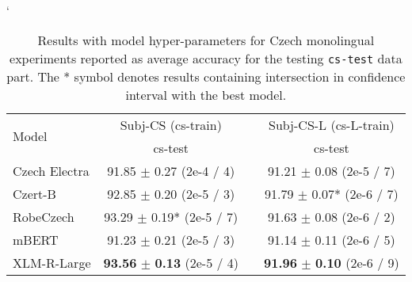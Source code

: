 \documentclass[10pt, a4paper]{article}
\begin{document}
\begin{table}[H]
\catcode`
\begin{adjustbox}{width=1\linewidth,center}
\begin{tabular}{lccc} \toprule
 \multirow{2}{*}{Model}                       & \multicolumn{1}{c}{Subj-CS (cs-train)}  &   & \multicolumn{1}{c}{Subj-CS-L (cs-L-train)}                                  \\ \cline{2-2} \cline{4-4} 
        & \multicolumn{1}{c}{cs-test}  &       & \multicolumn{1}{c}{cs-test}     \\ \midrule
Czech Electra & 91.85 $\pm$ 0.27\phantom{*} \footnotesize{(2e-4 / 4)}  & & 91.21 $\pm$ 0.08\phantom{*} \footnotesize{(2e-5 / 7)} \\
Czert-B    & 92.85 $\pm$ 0.20\phantom{*} \footnotesize{(2e-5 / 3)}  & & 91.79 $\pm$ 0.07* \footnotesize{(2e-6 / 7)} \\
RobeCzech    & 93.29 $\pm$ 0.19* \footnotesize{(2e-5 / 7)}   & & 91.63 $\pm$ 0.08\phantom{*} \footnotesize{(2e-6 / 2)} \\
mBERT        & 91.23 $\pm$ 0.21\phantom{*} \footnotesize{(2e-5 / 3)}  & & 91.14 $\pm$ 0.11\phantom{*} \footnotesize{(2e-6 / 5)} \\
XLM-R-Large  & \textbf{93.56} $\pm$ \textbf{0.13}\phantom{*} \footnotesize{(2e-5 / 4)}  & & \textbf{91.96} $\pm$ \textbf{0.10\phantom{*}} \footnotesize{(2e-6 / 9)} \\ \bottomrule
\end{tabular}
\end{adjustbox}
\caption{Results with model hyper-parameters for Czech monolingual experiments reported as average accuracy for the testing \texttt{cs-test} data part. The * symbol denotes results containing intersection in confidence interval with the best model.} \label{tab:hyper-monolingual-cs}
\end{table}
\end{document}
